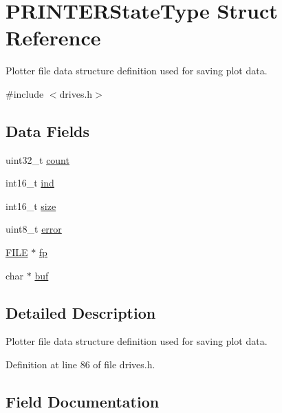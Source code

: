 \hypertarget{structPRINTERStateType}{}\section{P\+R\+I\+N\+T\+E\+R\+State\+Type Struct Reference}
\label{structPRINTERStateType}


Plotter file data structure definition used for saving plot data.  




{\ttfamily \#include $<$drives.\+h$>$}

\subsection*{Data Fields}
\begin{DoxyCompactItemize}
\item 
uint32\+\_\+t \hyperlink{structPRINTERStateType_ae115fc351910f3801e37b31f254fb8f4}{count}
\item 
int16\+\_\+t \hyperlink{structPRINTERStateType_a7d8873d0011f31d7dd00c2b7e0d362bd}{ind}
\item 
int16\+\_\+t \hyperlink{structPRINTERStateType_ac6d8323e47879ed58e7fa2cc7cfd7c30}{size}
\item 
uint8\+\_\+t \hyperlink{structPRINTERStateType_a6e5b550f5396901febd5475445132dd0}{error}
\item 
\hyperlink{posix_8h_aed4dabeb9f7c518ded42f930a04abce8}{F\+I\+LE} $\ast$ \hyperlink{structPRINTERStateType_a791c78d68d169f9d2e60d34b890e520a}{fp}
\item 
char $\ast$ \hyperlink{structPRINTERStateType_aa48220761aa3c77c954a55f09388c615}{buf}
\end{DoxyCompactItemize}


\subsection{Detailed Description}
Plotter file data structure definition used for saving plot data. 

Definition at line 86 of file drives.\+h.



\subsection{Field Documentation}
\mbox{\label{structPRINTERStateType_aa48220761aa3c77c954a55f09388c615}} 
